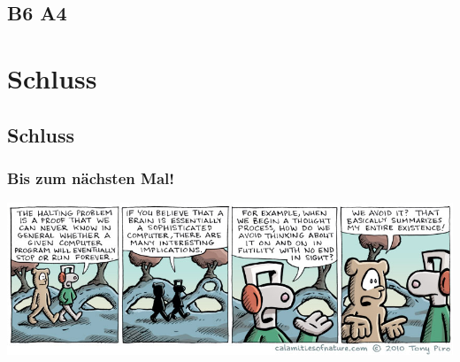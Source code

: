 \subsection{B6 A4}

\section{Schluss}
\subsection{Schluss}
\begin{frame}
\frametitle{Bis zum nächsten Mal!}
\begin{center}
  \includegraphics[width=1.59 \textheight]{images/halting.jpg}
\end{center}
\end{frame}

